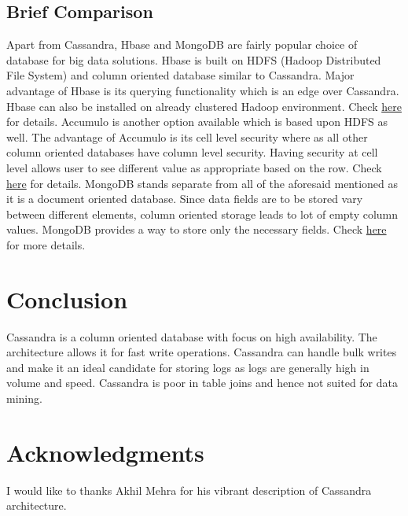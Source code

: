 \documentclass[9pt,twocolumn,twoside]{../../styles/osajnl}
\begin{document}
\subsection{Brief Comparison}
Apart from Cassandra, Hbase and MongoDB are fairly popular choice of database for big data solutions. Hbase is built on HDFS (Hadoop Distributed File System) and column oriented database similar to Cassandra. Major advantage of Hbase is its querying functionality which is an edge over Cassandra. Hbase can also be installed on already clustered Hadoop environment. Check \href{https://hbase.apache.org/}{here} for details. Accumulo is another option available which is based upon HDFS as well. The advantage of Accumulo is its cell level security where as all other column oriented databases have column level security. Having security at cell level allows user to see different value as appropriate based on the row. Check \href{https://accumulo.apache.org/}{here} for details. MongoDB stands separate from all of the aforesaid mentioned as it is a document oriented database. Since data fields are to be stored vary between different elements, column oriented storage leads to lot of empty column values. MongoDB provides a way to store only the necessary fields. Check \href{https://www.mongodb.org/}{here} for more details.

\section{Conclusion}
Cassandra is a column oriented database with focus on high availability. The architecture allows it for fast write operations. Cassandra can handle bulk writes and make it an ideal candidate for storing logs as logs are generally high in volume and speed. Cassandra is poor in table joins and hence not suited for data mining.

\section*{Acknowledgments}

I would like to thanks Akhil Mehra for his vibrant description of Cassandra architecture.



\end{document}
